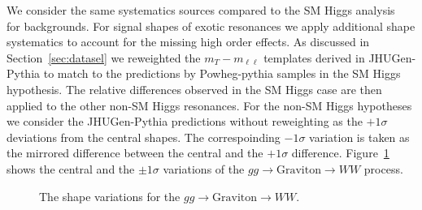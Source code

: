 We consider the same systematics sources compared to the 
SM Higgs analysis~\cite{HWWHCP2012} for backgrounds. 
For signal shapes of exotic resonances we apply additional 
shape systematics to account for the missing high order effects. 
As discussed in Section~\ref{sec:datasel} we reweighted the $m_T-m_{\ell\ell}$ templates 
derived in JHUGen-Pythia to match to the predictions by Powheg-pythia samples in 
the SM Higgs hypothesis. 
The relative differences observed in the SM Higgs case are then 
applied to the other non-SM Higgs resonances. 
For the non-SM Higgs hypotheses we consider the JHUGen-Pythia 
predictions without reweighting as the $+1\sigma$ deviations from the central shapes. 
The correspoinding $-1\sigma$ variation is taken as the mirrored difference between 
the central and the $+1\sigma$ difference. 
Figure~\ref{fig:xwwshapevar} shows the central and the $\pm1\sigma$ variations 
of the $gg\to \text{Graviton}\to WW$ process. 

\begin{figure}[!hbtp]
\centering
{}
\caption{The shape variations for the $gg\to \text{Graviton}\to WW$. 
}
\label{fig:xwwshapevar}
\end{figure}
